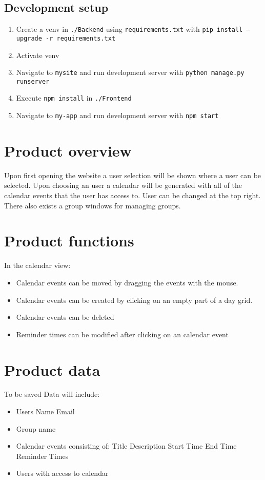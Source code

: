 \documentclass[]{article}
\begin{document}
	\subsection{Development setup}
		\begin{enumerate}
			\item Create a venv in \texttt{./Backend} using \texttt{requirements.txt} with \texttt{pip install --upgrade -r requirements.txt}
			\item Activate venv
			\item Navigate to \texttt{mysite} and run development server with \texttt{python manage.py runserver}
			\item Execute \texttt{npm install} in \texttt{./Frontend}
			\item Navigate to \texttt{my-app} and run development server with \texttt{npm start}
		\end{enumerate}
\section{Product overview}
	Upon first opening the website a user selection will be shown where a user can be selected. Upon choosing an user a calendar will be generated with all of the calendar events that the user has access to. User can be changed at the top right. There also exists a group windows for managing groups.
\section{Product functions}
	In the calendar view:
	\begin{itemize}
		\item Calendar events can be moved by dragging the events with the mouse.
		\item Calendar events can be created by clicking on an empty part of a day grid.
		\item Calendar events can be deleted
		\item Reminder times can be modified after clicking on an calendar event
	\end{itemize}
\section{Product data}
	To be saved Data will include:
	\begin{itemize}
		\item Users
			\subitem Name
			\subitem Email
		\item Group name
		\item Calendar events consisting of:
			\subitem Title
			\subitem Description
			\subitem Start Time
			\subitem End Time
			\subitem Reminder Times
		\item Users with access to calendar
	\end{itemize}
\end{document}
